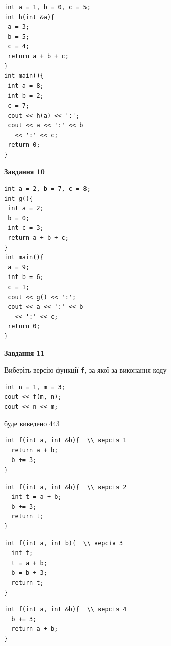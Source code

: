 \documentclass[12pt, ukrainian]{article}
\def\code#1{\Verb!#1!}
\begin{document}
{\begin {large}
\begin{minipage}[t]{7.0cm}
\begin{verbatim}
int a = 1, b = 0, c = 5;
int h(int &a){
 a = 3;
 b = 5;
 c = 4;
 return a + b + c;
}
int main(){
 int a = 8;
 int b = 2;
 c = 7;
 cout << h(a) << ':';
 cout << a << ':' << b 
   << ':' << c;
 return 0;
}
\end{verbatim}



\begin{center}
\textbf{Завдання 10}
\end{center}
\vspace{-8mm}

\begin{verbatim}
int a = 2, b = 7, c = 8;
int g(){
 int a = 2;
 b = 0;
 int c = 3;
 return a + b + c;
}
int main(){
 a = 9;
 int b = 6;
 c = 1;
 cout << g() << ':';
 cout << a << ':' << b 
   << ':' << c;
 return 0;
}
\end{verbatim}

\end{minipage}
\vline \hspace{1mm}
\begin{minipage}[t]{11.0cm}

\begin{center}
\textbf{Завдання 11}
\end{center}
Виберіть версію функції \code{f}, за якої за виконання коду
\begin{verbatim}
int n = 1, m = 3;
cout << f(m, n);
cout << n << m;
\end{verbatim}

буде виведено 443

\begin{verbatim}
int f(int a, int &b){  \\ версія 1
  return a + b;
  b += 3;
}
\end{verbatim}

\vspace{-8mm}\begin{verbatim}
int f(int a, int &b){  \\ версія 2
  int t = a + b;
  b += 3;
  return t;
}
\end{verbatim}

\vspace{-8mm}\begin{verbatim}
int f(int a, int b){  \\ версія 3
  int t;
  t = a + b;
  b = b + 3;
  return t;
}
\end{verbatim}

\vspace{-8mm}\begin{verbatim}
int f(int a, int &b){  \\ версія 4
  b += 3;
  return a + b;
}
\end{verbatim}




\end{minipage}
\end{large}}
\end{document}

